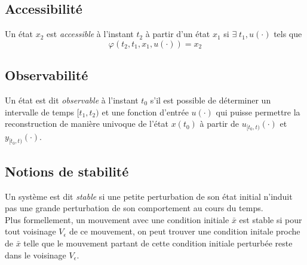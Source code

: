 \documentclass[a4paper]{article}
\begin{document}
\subsection{Accessibilité}
Un état $x_2$ est \emph{accessible} à l'instant $t_2$ à partir d'un état $x_1$
si $\exists\;t_1, u(\cdot)$ tels que \[\varphi(t_2,t_1,x_1,u(\cdot))=x_2\]

\subsection{Observabilité}
Un état est dit \emph{observable} à l'instant $t_0$ s'il est possible de déterminer
un intervalle de temps $[t_1,t_2)$ et une fonction d'entrée $u(\cdot)$ qui puisse
permettre la reconstruction de manière univoque de l'état $x(t_0)$ à partir de
$u_{[t_0,t)}(\cdot)$ et $y_{[t_0,t)}(\cdot)$.


\subsection{Notions de stabilité}
Un système est dit  \emph{stable} si une petite perturbation de son état initial
n'induit pas une grande perturbation de son comportement au cours du temps.\\
Plus formellement, un mouvement avec une condition initiale $\bar x$ est
stable si pour tout voisinage $V_\epsilon$ de ce mouvement, on peut trouver
une condition initale proche de $\bar x$ telle que le mouvement partant de
cette condition initiale perturbée reste dans le voisinage $V_\epsilon$.
\end{document}
